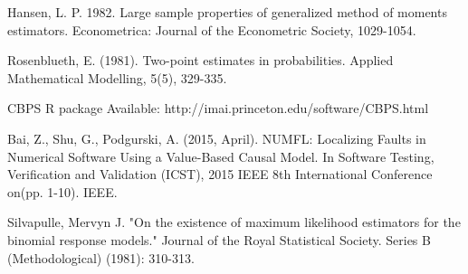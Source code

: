 \documentclass[times]{stvrauth}
\begin{document}
\begin{thebibliography}{9}
 Hansen, L. P. 1982. Large sample properties of generalized method of moments estimators. Econometrica: Journal of the Econometric Society, 1029-1054.

 Rosenblueth, E. (1981). Two-point estimates in probabilities. Applied Mathematical Modelling, 5(5), 329-335.

 CBPS R package Available: http://imai.princeton.edu/software/CBPS.html

	Bai, Z., Shu, G.,  Podgurski, A. (2015, April). NUMFL: Localizing Faults in Numerical Software Using a Value-Based Causal Model. In Software Testing, Verification and Validation (ICST), 2015 IEEE 8th International Conference on(pp. 1-10). IEEE.

 Silvapulle, Mervyn J. "On the existence of maximum likelihood estimators for the binomial response models." Journal of the Royal Statistical Society. Series B (Methodological) (1981): 310-313.
\end{thebibliography}
\end{document}
